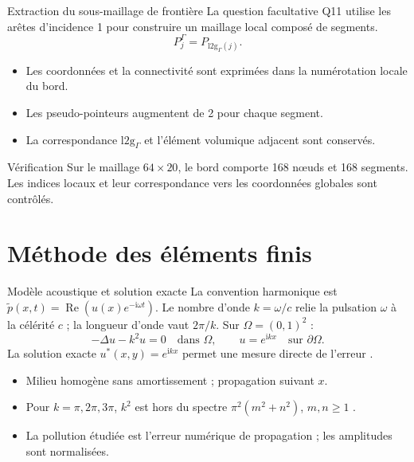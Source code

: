 \documentclass[12pt,aspectratio=169,t]{beamer}
\begin{document}
\begin{frame}{Extraction du sous-maillage de frontière}
La question facultative Q11 utilise les arêtes d'incidence 1 pour construire un maillage local composé de segments.
\[
P^\Gamma_j=P_{\mathrm{l2g}_\Gamma(j)}.
\]
\begin{itemize}
\item Les coordonnées et la connectivité sont exprimées dans la numérotation locale du bord.
\item Les pseudo-pointeurs augmentent de 2 pour chaque segment.
\item La correspondance $\mathrm{l2g}_\Gamma$ et l'élément volumique adjacent sont conservés.
\end{itemize}
\begin{block}{Vérification}
Sur le maillage $64\times20$, le bord comporte 168 nœuds et 168 segments. Les indices locaux et leur correspondance vers les coordonnées globales sont contrôlés.
\end{block}
\end{frame}


\section{Méthode des éléments finis}
\begin{frame}{Modèle acoustique et solution exacte}
La convention harmonique est $\widetilde p(x,t)=\operatorname{Re}(u(x)e^{-\mathrm{i}\omega t})$. Le nombre d'onde $k=\omega/c$ relie la pulsation $\omega$ à la célérité $c$ ; la longueur d'onde vaut $2\pi/k$. Sur $\Omega=(0,1)^2$ :
\[
-\Delta u-k^2u=0\quad\text{dans }\Omega,\qquad
u=e^{\mathrm{i}kx}\quad\text{sur }\partial\Omega.
\]
La solution exacte $u^*(x,y)=e^{\mathrm{i}kx}$ permet une mesure directe de l'erreur \cite{model}.
\begin{itemize}
\item Milieu homogène sans amortissement ; propagation suivant $x$.
\item Pour $k=\pi,2\pi,3\pi$, $k^2$ est hors du spectre $\pi^2(m^2+n^2)$, $m,n\geq1$ \cite{eigen}.
\item La pollution étudiée est l'erreur numérique de propagation ; les amplitudes sont normalisées.
\end{itemize}
\end{frame}
\end{document}
